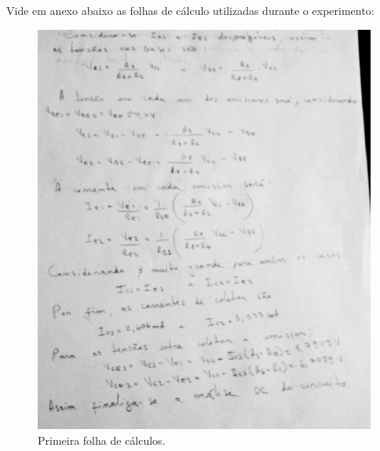 Vide em anexo abaixo as folhas de cálculo utilizadas durante o experimento:

\begin{figure}[h!] 
\includegraphics[scale=1]{imagens/calc1.png} 
\centering
\caption{Primeira folha de cálculos.}
\label{calc:1} 
\end{figure} 

